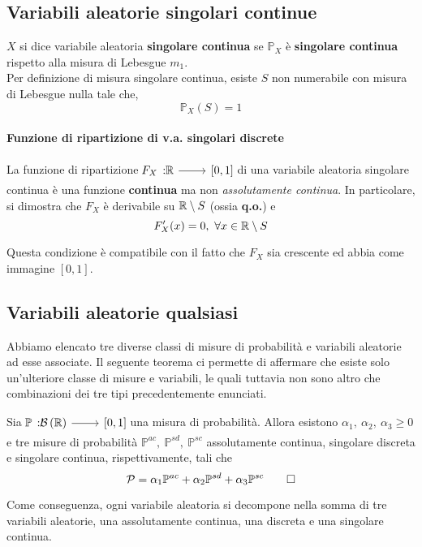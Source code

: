 \subsection{Variabili aleatorie singolari continue}
\begin{define}
	$X$ si dice variabile aleatoria \textbf{singolare continua} se $\mathbb{P}_X$ è \textbf{singolare continua} rispetto alla misura di Lebesgue $m_1$.\\
	Per definizione di misura singolare continua, esiste $S$ non numerabile con misura di Lebesgue nulla tale che,
	\begin{equation}
		\mathbb{P}_X\left(S\right)=1
	\end{equation}
\end{define}
\paragraph{Funzione di ripartizione di v.a. singolari discrete}
La funzione di ripartizione $\funz{F_X}{\realset}{\left[0,1\right]}$ di una variabile aleatoria singolare continua è una funzione \textbf{continua} ma non \textit{assolutamente continua}.%
In particolare, si dimostra che $F_X$ è derivabile su $\mathbb{R}\setminus S$ (ossia \textbf{q.o.}) e
\begin{equation}
	F'_X(x)=0,\ \forall x\in\realset\setminus S
\end{equation}
\begin{observe}
	Questa condizione è compatibile con il fatto che $F_X$ sia crescente ed abbia come immagine $\left[0,1\right]$.
\end{observe}
\begin{examplewt}
\end{examplewt}
\subsection{Variabili aleatorie qualsiasi}
Abbiamo elencato tre diverse classi di misure di probabilità e variabili aleatorie ad esse associate. Il seguente teorema ci permette di affermare che esiste solo un'ulteriore classe di misure e variabili, le quali tuttavia non sono altro che combinazioni dei tre tipi precedentemente enunciati. 
\begin{theoremaqed}
	Sia $\funz{\mathbb{P}}{\mathcal{B}\left(\realset\right)}{\left[0,1\right]}$ una misura di probabilità. Allora esistono $\alpha_1,\ \alpha_2,\ \alpha_3\geq 0$ e tre misure di probabilità $\mathbb{P}^{ac},\ \mathbb{P}^{sd},\ \mathbb{P}^{sc}$ assolutamente continua, singolare discreta e singolare continua, rispettivamente, tali che
	\begin{equation}
		\mathcal{P}=\alpha_1\mathbb{P}^{ac}+\alpha_2\mathbb{P}^{sd}+\alpha_3\mathbb{P}^{sc}\qedhere
	\end{equation}
\end{theoremaqed}
Come conseguenza, ogni variabile aleatoria si decompone nella somma di tre variabili aleatorie, una assolutamente continua, una discreta e una singolare continua.
